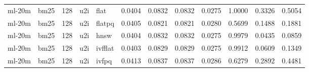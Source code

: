 \begin{tabular}{llrllrrrrrrr}
ml-20m & bm25 & 128 & u2i & flat & 0.0404 & 0.0832 & 0.0832 & 0.0275 & 1.0000 & 0.3326 & 0.5054 \\
ml-20m & bm25 & 128 & u2i & flatpq & 0.0405 & 0.0821 & 0.0821 & 0.0280 & 0.5699 & 0.1488 & 0.1881 \\
ml-20m & bm25 & 128 & u2i & hnsw & 0.0404 & 0.0832 & 0.0832 & 0.0275 & 0.9979 & 0.0435 & 0.0859 \\
ml-20m & bm25 & 128 & u2i & ivfflat & 0.0403 & 0.0829 & 0.0829 & 0.0275 & 0.9912 & 0.0609 & 0.1349 \\
ml-20m & bm25 & 128 & u2i & ivfpq & 0.0413 & 0.0837 & 0.0837 & 0.0286 & 0.6279 & 0.2892 & 0.4481 \\
\bottomrule
\end{tabular}
